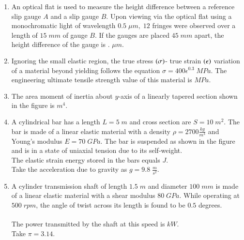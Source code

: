 \documentclass[journal,12pt,onecolumn]{IEEEtran}
\theoremstyle{remark}
\begin{document}
\begin{enumerate}[start=53]

\item An optical flat is used to measure the height difference between a reference slip gauge $A$ and a slip gauge $B$. Upon viewing via the optical flat using a monochromatic light of wavelength $0.5\;\mu m,\;12$ fringes were observed over a length of $15\;mm$ of gauge $B$. If the gauges are placed $45\;mm$ apart, the height difference of the gauge is \underline{\hspace{2cm}}. $\mu m$.\\  

\item Ignoring the small elastic region, the true stress $\left(\sigma\right)$- true strain $\left(\epsilon\right)$ variation of a material beyond yielding follows the equation $\sigma=400\epsilon^{0.3}\;MPa$. The engineering ultimate tensile strength value of this material is \underline{\hspace{2cm}} $MPa$.\\ 
\item The area moment of inertia about $y$-axis of a linearly tapered section shown in the figure is \underline{\hspace{2cm}} $m^4$.\\ 

\item A cylindrical bar has a length $L=5\;m$ and cross section are $S=10\;m^2$. The bar is made of a linear elastic material with a density $\rho =2700\frac{kg}{m^3}$ and Young's modulus $E=70\;GPa$. The bar is suspended as shown in the figure and is in a state of uniaxial tension due to its self-weight.\\ The elastic strain energy stored in the bars equals \underline{\hspace{2cm}} $J$.\\ Take the acceleration due to gravity as $g=9.8\;\frac{m}{s^2}$.

\item A cylinder transmission shaft of length $1.5\;m$ and diameter $100\;mm$ is made of a linear elastic material with a shear modulus $80\;GPa$. While operating at $500\;rpm$, the angle of twist across its length is found to be $0.5$ degrees.\\\\ The power transmitted by the shaft at this speed is \underline{\hspace{2cm}} $kW$. \\ Take $\pi =3.14$. 

\end{enumerate}
\end{document}
